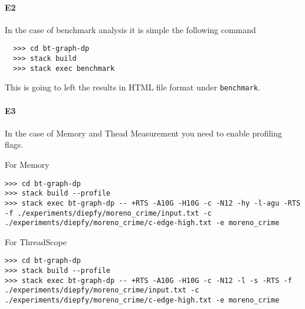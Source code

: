 \paragraph{E2} In the case of benchmark analysis it is simple the following command
\begin{verbatim}
  >>> cd bt-graph-dp
  >>> stack build
  >>> stack exec benchmark
  \end{verbatim}

\setlength{\rightskip}{0pt plus 1 fil}
This is going to left the results in HTML file format under \texttt{benchmark}.


\paragraph{E3} In the case of Memory and Thead Measurement you need to enable profiling flags.

For Memory
\begin{verbatim}
>>> cd bt-graph-dp
>>> stack build --profile
>>> stack exec bt-graph-dp -- +RTS -A10G -H10G -c -N12 -hy -l-agu -RTS -f ./experiments/diepfy/moreno_crime/input.txt -c ./experiments/diepfy/moreno_crime/c-edge-high.txt -e moreno_crime
\end{verbatim}

For ThreadScope
\begin{verbatim}
>>> cd bt-graph-dp
>>> stack build --profile
>>> stack exec bt-graph-dp -- +RTS -A10G -H10G -c -N12 -l -s -RTS -f ./experiments/diepfy/moreno_crime/input.txt -c ./experiments/diepfy/moreno_crime/c-edge-high.txt -e moreno_crime
\end{verbatim}
